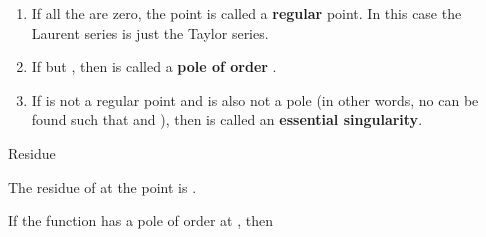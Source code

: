 \begin{enumerate}
\def\labelenumi{\arabic{enumi}.}
\tightlist
\item
  If all the  are zero, the point  is called a \textbf{regular} point. In this case the Laurent series is just the Taylor series.
\item
  If  but , then  is called a \textbf{pole of order }.
\item
  If  is not a regular point and is also not a pole (in other words, no  can be found such that  and ), then  is called an \textbf{essential singularity}.
\end{enumerate}

\EMhold


\begin{EMdefinition}{Residue}

The residue of  at the point  is .

\end{EMdefinition}

\begin{EMtheorem}{}

If the function  has a pole of order  at , then

\end{EMtheorem}

